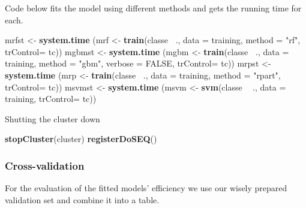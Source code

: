 \documentclass[]{article}
\newenvironment{Shaded}{\begin{snugshade}}{\end{snugshade}}
\newcommand{\KeywordTok}[1]{\textcolor[rgb]{0.13,0.29,0.53}{\textbf{#1}}}
\newcommand{\DataTypeTok}[1]{\textcolor[rgb]{0.13,0.29,0.53}{#1}}
\newcommand{\StringTok}[1]{\textcolor[rgb]{0.31,0.60,0.02}{#1}}
\newcommand{\OtherTok}[1]{\textcolor[rgb]{0.56,0.35,0.01}{#1}}
\newcommand{\OperatorTok}[1]{\textcolor[rgb]{0.81,0.36,0.00}{\textbf{#1}}}
\newcommand{\NormalTok}[1]{#1}
\begin{document}
Code below fits the model using different methods and gets the running
time for each.

\begin{Shaded}
\begin{Highlighting}[]
\NormalTok{mrfst <-}\StringTok{ }\KeywordTok{system.time}\NormalTok{ (mrf <-}\StringTok{ }\KeywordTok{train}\NormalTok{(classe }\OperatorTok{~}\NormalTok{., }
        \DataTypeTok{data =}\NormalTok{ training, }\DataTypeTok{method =} \StringTok{"rf"}\NormalTok{, }\DataTypeTok{trControl=}\NormalTok{ tc))}
\NormalTok{mgbmst <-}\StringTok{ }\KeywordTok{system.time}\NormalTok{ (mgbm <-}\StringTok{ }\KeywordTok{train}\NormalTok{(classe }\OperatorTok{~}\NormalTok{., }
        \DataTypeTok{data =}\NormalTok{ training, }\DataTypeTok{method =} \StringTok{"gbm"}\NormalTok{, }
        \DataTypeTok{verbose =} \OtherTok{FALSE}\NormalTok{, }\DataTypeTok{trControl=}\NormalTok{ tc))}
\NormalTok{mrpst <-}\StringTok{ }\KeywordTok{system.time}\NormalTok{ (mrp <-}\StringTok{ }\KeywordTok{train}\NormalTok{(classe }\OperatorTok{~}\NormalTok{., }
        \DataTypeTok{data =}\NormalTok{ training, }\DataTypeTok{method =} \StringTok{"rpart"}\NormalTok{, }
        \DataTypeTok{trControl=}\NormalTok{ tc))}
\NormalTok{msvmst <-}\StringTok{ }\KeywordTok{system.time}\NormalTok{ (msvm <-}\StringTok{ }\KeywordTok{svm}\NormalTok{(classe }\OperatorTok{~}\StringTok{ }\NormalTok{., }
        \DataTypeTok{data =}\NormalTok{ training, }\DataTypeTok{trControl=}\NormalTok{ tc))}
\end{Highlighting}
\end{Shaded}

Shutting the cluster down

\begin{Shaded}
\begin{Highlighting}[]
\KeywordTok{stopCluster}\NormalTok{(cluster)}
\KeywordTok{registerDoSEQ}\NormalTok{()}
\end{Highlighting}
\end{Shaded}

\subsubsection{Cross-validation}\label{cross-validation}

For the evaluation of the fitted models' efficiency we use our wisely
prepared validation set and combine it into a table.
\end{document}
